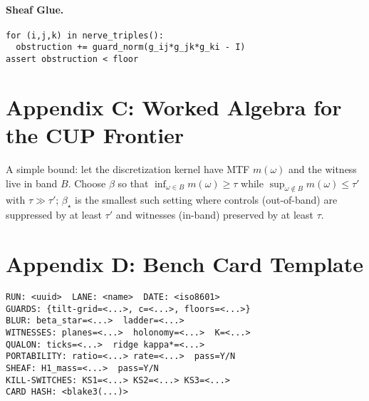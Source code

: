 \documentclass[11pt]{article}
\newcommand{\1}{\mathbf{1}}
\begin{document}
\paragraph{Sheaf Glue.}
{\small
\begin{verbatim}
for (i,j,k) in nerve_triples():
  obstruction += guard_norm(g_ij*g_jk*g_ki - I)
assert obstruction < floor
\end{verbatim}}

\section*{Appendix C: Worked Algebra for the CUP Frontier}
A simple bound: let the discretization kernel have MTF $m(\omega)$ and the witness live in band $B$. Choose $\beta$ so that $\inf_{\omega\in B} m(\omega)\ge \tau$ while $\sup_{\omega\notin B} m(\omega)\le \tau'$ with $\tau\gg\tau'$; $\beta_\star$ is the smallest such setting where controls (out-of-band) are suppressed by at least $\tau'$ and witnesses (in-band) preserved by at least $\tau$.

\section*{Appendix D: Bench Card Template}
\begin{verbatim}
RUN: <uuid>  LANE: <name>  DATE: <iso8601>
GUARDS: {tilt-grid=<...>, c=<...>, floors=<...>}
BLUR: beta_star=<...>  ladder=<...>
WITNESSES: planes=<...>  holonomy=<...>  K=<...>
QUALON: ticks=<...>  ridge kappa*=<...>
PORTABILITY: ratio=<...> rate=<...>  pass=Y/N
SHEAF: H1_mass=<...>  pass=Y/N
KILL-SWITCHES: KS1=<...> KS2=<...> KS3=<...>
CARD HASH: <blake3(...)>
\end{verbatim}

\end{document}
